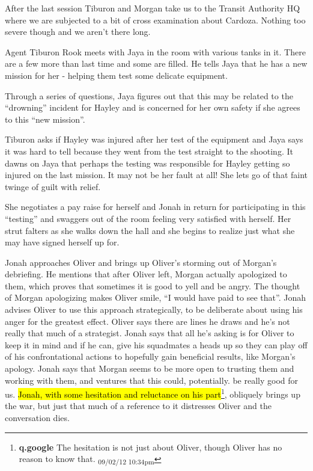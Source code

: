 


After the last session Tiburon and Morgan take us to the Transit Authority HQ where we are subjected to a bit of cross examination about Cardoza.  Nothing too severe though and we aren't there long.



Agent Tiburon Rook meets with Jaya in the room with various tanks in it.  There are a few more than last time and some are filled.  He tells Jaya that he has a new mission for her - helping them test some delicate equipment.



Through a series of questions, Jaya figures out that this may be related to the ``drowning'' incident for Hayley and is concerned for her own safety if she agrees to this ``new mission''.



Tiburon asks if Hayley was injured after her test of the equipment and Jaya says it was hard to tell because they went from the test straight to the shooting.   It dawns on Jaya that perhaps the testing was responsible for Hayley getting so injured on the last mission.  It may not be her fault at all!  She lets go of that faint twinge of guilt with relief.



She negotiates a pay raise for herself and Jonah in return for participating in this ``testing'' and swaggers out of the room feeling very satisfied with herself.  Her strut falters as she walks down the hall and she begins to realize just what she may have signed herself up for.



Jonah approaches Oliver and brings up Oliver's storming out of Morgan's debriefing.  He mentions that after Oliver left, Morgan actually apologized to them, which proves that sometimes it is good to yell and be angry.  The thought of Morgan apologizing makes Oliver smile, ``I would have paid to see that''.  Jonah advises Oliver to use this approach strategically, to be deliberate about using his anger for the greatest effect.  Oliver says there are lines he draws and he's not really that much of a strategist.  Jonah says that all he's asking is for Oliver to keep it in mind and if he can, give his squadmates a heads up so they can play off of his confrontational actions to hopefully gain beneficial results, like Morgan's apology.  Jonah says that Morgan seems to be more open to trusting them and working with them, and ventures that this could, potentially. be really good for us.  \hl{Jonah, with some hesitation and reluctance on his part}\footnote{\textbf{q.google }The hesitation is not just about Oliver, though Oliver has no reason to know that. \textsubscript{09/02/12 10:34pm}}, obliquely brings up the war, but just that much of a reference to it distresses Oliver and the conversation dies.



